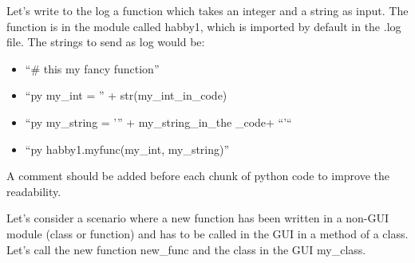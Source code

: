 \documentclass[letterpaper,10pt,english]{sphinxmanual}
\begin{document}

Let’s write to the log a function which takes an integer and a string as input. The function
is in the module called habby1, which is imported by default in the .log file. The strings to send
as log would be:
\begin{itemize}
\item {} 
``\#  this my fancy function''

\item {} 
``py    my\_int = '' + str(my\_int\_in\_code)

\item {} 
``py    my\_string = ’” + my\_string\_in\_the \_code+ ``'“

\item {} 
``py    habby1.myfunc(my\_int, my\_string)''

\end{itemize}

A comment should be added before each chunk of python code to improve the readability.


Let’s consider a scenario where a new function has been written in a non-GUI module (class or
function) and has to be called in the GUI in a method of a class. Let’s call the new function
new\_func and the class in the GUI my\_class.
\end{document}
